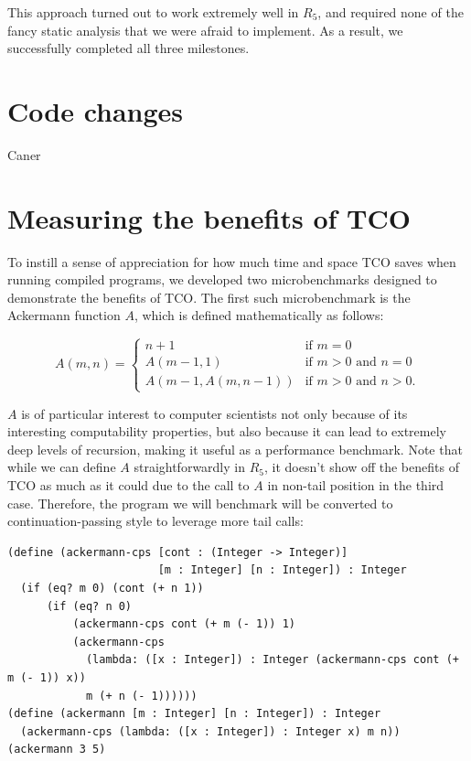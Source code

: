 \documentclass[12pt]{article}
\begin{document}
This approach turned out to work extremely well in $R_5$, and required none of the
fancy static analysis that we were afraid to implement. As a result, we successfully
completed all three milestones.

\section{Code changes}
Caner

\section{Measuring the benefits of TCO}

To instill a sense of appreciation for how much time and space TCO saves when running
compiled programs, we developed two microbenchmarks designed to demonstrate the benefits
of TCO. The first such microbenchmark is the Ackermann function $A$, which is defined
mathematically as follows:

$$
A(m, n) = \begin{cases}
  n+1               & \mbox{if } m = 0 \\
  A(m-1, 1)         & \mbox{if } m > 0 \mbox{ and } n = 0 \\
  A(m-1, A(m, n-1)) & \mbox{if } m > 0 \mbox{ and } n > 0.
\end{cases}
$$

$A$ is of particular interest to computer scientists not only
because of its interesting computability properties, but also because it can lead
to extremely deep levels of recursion, making it useful as a performance benchmark.
Note that while we can define $A$ straightforwardly in $R_5$, it doesn't show off
the benefits of TCO as much as it could due to the call to $A$ in non-tail position
in the third case. Therefore, the program we will benchmark will be converted
to continuation-passing style to leverage more tail calls:

\begin{verbatim}
(define (ackermann-cps [cont : (Integer -> Integer)]
                       [m : Integer] [n : Integer]) : Integer
  (if (eq? m 0) (cont (+ n 1))
      (if (eq? n 0)
          (ackermann-cps cont (+ m (- 1)) 1)
          (ackermann-cps
            (lambda: ([x : Integer]) : Integer (ackermann-cps cont (+ m (- 1)) x))
            m (+ n (- 1))))))
(define (ackermann [m : Integer] [n : Integer]) : Integer
  (ackermann-cps (lambda: ([x : Integer]) : Integer x) m n))
(ackermann 3 5)
\end{verbatim}
\end{document}
